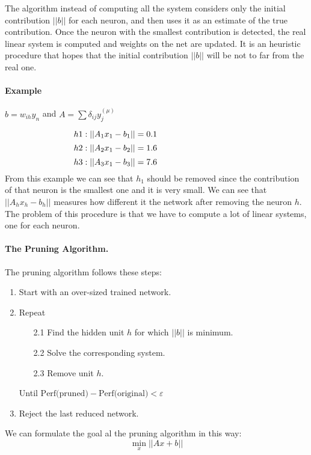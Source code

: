 The  algorithm instead of computing all the system considers only the initial contribution $||b||$ for each neuron, and then uses it as an estimate of the true contribution. Once the neuron with the smallest contribution is detected, the real linear system is computed and weights on the net are updated. It is an heuristic procedure that hopes that the initial contribution $||b||$ will be not to far from the real one.

\paragraph{Example} $b = w_{ih}y_n$ and $A= \sum\delta_{ij}y_j^{(\mu)}$

$$h1: \vert \vert A_1x_1 - b_1 \vert \vert  = 0.1 \hspace{9.7em} $$
$$h2: \vert \vert A_2x_1 - b_2 \vert \vert  = 1.6 \hspace{9.7em} $$
$$h3: \vert \vert A_3x_1 - b_3 \vert \vert  = 7.6 \hspace{9.7em} $$
From this example we can see that $h_1$ should be removed since the contribution of that neuron is the smallest one and it is very small. We can see that $ \vert \vert A_hx_h - b_h\vert \vert$ measures how different it the network after removing the neuron $h$.
The problem of this procedure is that we have to compute a lot of linear systems, one for each neuron.



\paragraph*{The Pruning Algorithm.}
The pruning algorithm follows these steps:
\begin{enumerate}
	\item Start with an over-sized trained network.
	\item Repeat
	\begin{enumerate}
		\item[2.1] Find the hidden unit $h$ for which $\vert \vert b \vert \vert$ is minimum.
		\item[2.2] Solve the corresponding system.
		\item[2.3] Remove unit $h$.
	\end{enumerate}
	Until $\text{Perf(pruned)} - \text{Perf(original)} < \varepsilon$
	\item Reject the last reduced network.
\end{enumerate}
We can formulate the goal al the pruning algorithm in this way:
$$\min_x \vert\vert Ax + b \vert\vert$$
